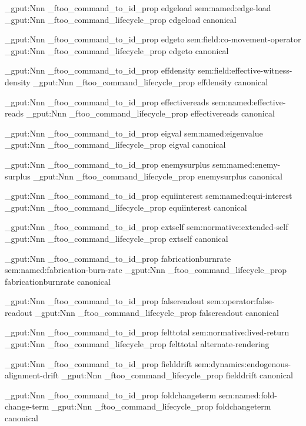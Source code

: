 \prop_gput:Nnn \g_ftoo_command_to_id_prop { edgeload } { sem:named:edge-load }
\prop_gput:Nnn \g_ftoo_command_lifecycle_prop { edgeload } { canonical }


\prop_gput:Nnn \g_ftoo_command_to_id_prop { edgeto } { sem:field:co-movement-operator }
\prop_gput:Nnn \g_ftoo_command_lifecycle_prop { edgeto } { canonical }


\prop_gput:Nnn \g_ftoo_command_to_id_prop { effdensity } { sem:field:effective-witness-density }
\prop_gput:Nnn \g_ftoo_command_lifecycle_prop { effdensity } { canonical }


\prop_gput:Nnn \g_ftoo_command_to_id_prop { effectivereads } { sem:named:effective-reads }
\prop_gput:Nnn \g_ftoo_command_lifecycle_prop { effectivereads } { canonical }


\prop_gput:Nnn \g_ftoo_command_to_id_prop { eigval } { sem:named:eigenvalue }
\prop_gput:Nnn \g_ftoo_command_lifecycle_prop { eigval } { canonical }


\prop_gput:Nnn \g_ftoo_command_to_id_prop { enemysurplus } { sem:named:enemy-surplus }
\prop_gput:Nnn \g_ftoo_command_lifecycle_prop { enemysurplus } { canonical }


\prop_gput:Nnn \g_ftoo_command_to_id_prop { equiinterest } { sem:named:equi-interest }
\prop_gput:Nnn \g_ftoo_command_lifecycle_prop { equiinterest } { canonical }


\prop_gput:Nnn \g_ftoo_command_to_id_prop { extself } { sem:normative:extended-self }
\prop_gput:Nnn \g_ftoo_command_lifecycle_prop { extself } { canonical }


\prop_gput:Nnn \g_ftoo_command_to_id_prop { fabricationburnrate } { sem:named:fabrication-burn-rate }
\prop_gput:Nnn \g_ftoo_command_lifecycle_prop { fabricationburnrate } { canonical }


\prop_gput:Nnn \g_ftoo_command_to_id_prop { falsereadout } { sem:operator:false-readout }
\prop_gput:Nnn \g_ftoo_command_lifecycle_prop { falsereadout } { canonical }


\prop_gput:Nnn \g_ftoo_command_to_id_prop { felttotal } { sem:normative:lived-return }
\prop_gput:Nnn \g_ftoo_command_lifecycle_prop { felttotal } { alternate-rendering }


\prop_gput:Nnn \g_ftoo_command_to_id_prop { fielddrift } { sem:dynamics:endogenous-alignment-drift }
\prop_gput:Nnn \g_ftoo_command_lifecycle_prop { fielddrift } { canonical }


\prop_gput:Nnn \g_ftoo_command_to_id_prop { foldchangeterm } { sem:named:fold-change-term }
\prop_gput:Nnn \g_ftoo_command_lifecycle_prop { foldchangeterm } { canonical }


